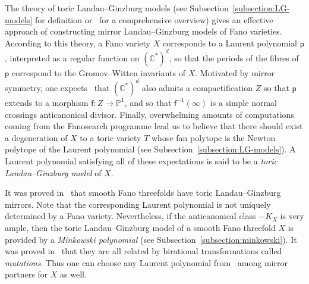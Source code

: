 \documentclass[10pt]{amsart}
\numberwithin{equation}{section}
\theoremstyle{plain}
\theoremstyle{definition}
\theoremstyle{remark}
\begin{document}
The theory of toric Landau--Ginzburg models (see Subsection~\ref{subsection:LG-models} for definition or~\cite{przyjalkowski2018review} for a comprehensive overview) gives an effective approach of constructing mirror Landau--Ginzburg models of Fano varieties. According to this theory, a Fano variety \(X\) corresponds to a Laurent polynomial \(\mathsf{p}\), interpreted as a regular function on \((\mathbb{C}^*)^d\), so that the periods of the fibres of \(\mathsf{p}\) correspond to the Gromov--Witten invariants of \(X\). Motivated by mirror symmetry, one expects~\cite{przyjalkowski2017compactification} that \((\mathbb{C}^*)^d\) also admits a compactification \(Z\) so that \(\mathsf{p}\) extends to a morphism \(\mathsf{f} \colon Z\rightarrow \mathbb{P}^1\), and so that \(\mathsf{f}^{-1}(\infty)\) is a simple normal crossings anticanonical divisor. Finally, overwhelming amounts of computations coming from the Fanosearch programme lead us to believe that there  should exist a degeneration of \(X\) to a toric variety \(T\) whose fan polytope is the Newton polytope of the Laurent polynomial (see Subsection~\ref{subsection:LG-models}). A Laurent polynomial satisfying all of these expectations is said to be a \emph{toric Landau--Ginzburg model} of \(X\).

It was proved in~\cite{przyjalkowski2008LG,przyjalkowski2013weak,akhtar2012minkowski,coates2016quantum} that smooth Fano threefolds have toric Landau--Ginzburg mirrors. Note that the corresponding Laurent polynomial is not uniquely determined by a Fano variety. Nevertheless, if the anticanonical class \(-K_X\) is very ample, then the toric Landau--Ginzburg model of a smooth Fano threefold \(X\) is provided by a \emph{Minkowski polynomial} (see Subsection~\ref{subsection:minkowski}). It was proved in~\cite{akhtar2012minkowski} that they are all related by birational transformations called \emph{mutations}. Thus one can choose any Laurent polynomial from~\cite[Appendix~B]{akhtar2012minkowski} among mirror partners for \(X\) as well.
\end{document}
